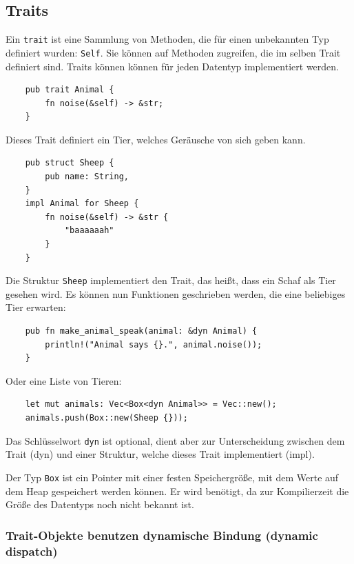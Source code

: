 \subsection{Traits}

Ein \verb"trait" ist eine Sammlung von Methoden, die für einen unbekannten Typ definiert wurden: \verb"Self". Sie können auf Methoden zugreifen, die im selben Trait definiert sind. Traits können können für jeden Datentyp implementiert werden. \cite{RustExample}

\begin{lstlisting}
    pub trait Animal {
        fn noise(&self) -> &str;
    }
\end{lstlisting}

Dieses Trait definiert ein Tier, welches Geräusche von sich geben kann.

\begin{lstlisting}
    pub struct Sheep {
        pub name: String,
    }
    impl Animal for Sheep {
        fn noise(&self) -> &str {
            "baaaaaah"
        }
    }
\end{lstlisting}

Die Struktur \verb"Sheep" implementiert den Trait, das heißt, dass ein Schaf als Tier gesehen wird. Es können nun Funktionen geschrieben werden, die eine beliebiges Tier erwarten:

\begin{lstlisting}
    pub fn make_animal_speak(animal: &dyn Animal) {
        println!("Animal says {}.", animal.noise());
    }
\end{lstlisting}

Oder eine Liste von Tieren:

\begin{lstlisting}
    let mut animals: Vec<Box<dyn Animal>> = Vec::new();
    animals.push(Box::new(Sheep {}));
\end{lstlisting}

Das Schlüsselwort \verb"dyn" ist optional, dient aber zur Unterscheidung zwischen dem Trait (dyn) und einer Struktur, welche dieses Trait implementiert (impl).

Der Typ \verb"Box" ist ein Pointer mit einer festen Speichergröße, mit dem Werte auf dem Heap gespeichert werden können. Er wird benötigt, da zur Kompilierzeit die Größe des Datentyps noch nicht bekannt ist.

\subsubsection{Trait-Objekte benutzen dynamische Bindung (dynamic dispatch)}

